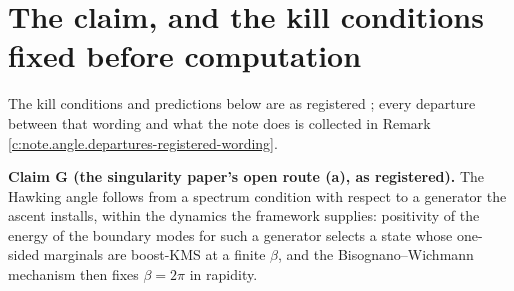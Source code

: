 \documentclass[11pt]{article}
\theoremstyle{definition}
\theoremstyle{plain}
\begin{document}
\section{The claim, and the kill conditions fixed before computation}

\label{c:note.angle.setting-claim-kill-conditions-fixed-before}
The kill conditions and predictions below are as registered \cite{ButlerPreregT05angle}; every departure between that wording and what the note does is collected in Remark \ref{c:note.angle.departures-registered-wording}.

\label{c:note.angle.setting-claim-kill-conditions-fixed-before-2}
\textbf{Claim G (the singularity paper's open route (a), as registered).} The Hawking angle follows from a spectrum condition with respect to a generator the ascent installs, within the dynamics the framework supplies: positivity of the energy of the boundary modes for such a generator selects a state whose one-sided marginals are boost-KMS at a finite $\beta$, and the Bisognano--Wichmann mechanism then fixes $\beta = 2\pi$ in rapidity.
\end{document}
